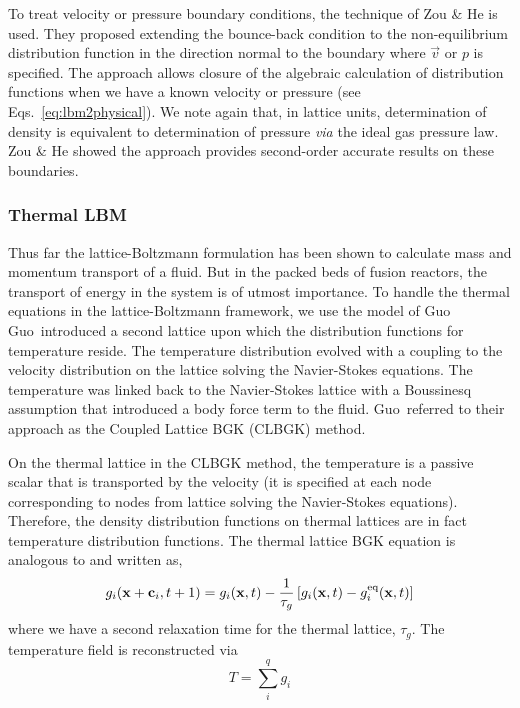 To treat velocity or pressure boundary conditions, the technique of Zou \& He is used.\cite{Zou1997} They proposed extending the bounce-back condition to the non-equilibrium distribution function in the direction normal to the boundary where $\vec{v}$ or $p$ is specified. The approach allows closure of the algebraic calculation of distribution functions when we have a known velocity or pressure (see Eqs.~\ref{eq:lbm2physical}). We note again that, in lattice units, determination of density is equivalent to determination of pressure \textit{via} the ideal gas pressure law. Zou \& He showed the approach provides second-order accurate results on these boundaries.\cite{Zou1997} 












\subsubsection{Thermal LBM}

Thus far the lattice-Boltzmann formulation has been shown to calculate mass and momentum transport of a fluid. But in the packed beds of fusion reactors, the transport of energy in the system is of utmost importance. To handle the thermal equations in the lattice-Boltzmann framework, we use the model of Guo\etal\cite{Guo2002} Guo\etal~introduced a second lattice upon which the distribution functions for temperature reside. The temperature distribution evolved with a coupling to the velocity distribution on the lattice solving the Navier-Stokes equations. The temperature was linked back to the Navier-Stokes lattice with a Boussinesq assumption that introduced a body force term to the fluid.\cite{Guo2002} Guo\etal~referred to their approach as the Coupled Lattice BGK (CLBGK) method. 

On the thermal lattice in the CLBGK method, the temperature is a passive scalar that is transported by the velocity (it is specified at each node corresponding to nodes from lattice solving the Navier-Stokes equations). Therefore, the density distribution functions on thermal lattices are in fact temperature distribution functions. The thermal lattice BGK equation is analogous to  and written as,
\begin{equation}\label{eq:lbm-thermal-bgk}
	g_i(\mathbf{x}+\mathbf{c}_i, t + 1) = g_i(\mathbf{x},t) - \frac{1}{\tau_g}\left[g_i(\mathbf{x},t) - g_i^{\text{eq}}(\mathbf{x},t)\right]
\end{equation}
where we have a second relaxation time for the thermal lattice, $\tau_g$. The temperature field is reconstructed via
\begin{equation}
	T = \sum_i^q g_i
\end{equation}

